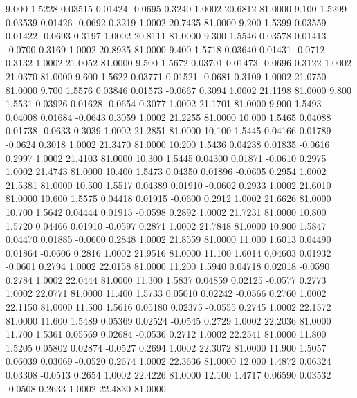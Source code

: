    9.000   1.5228   0.03515   0.01424  -0.0695   0.3240   1.0002  20.6812  81.0000
   9.100   1.5299   0.03539   0.01426  -0.0692   0.3219   1.0002  20.7435  81.0000
   9.200   1.5399   0.03559   0.01422  -0.0693   0.3197   1.0002  20.8111  81.0000
   9.300   1.5546   0.03578   0.01413  -0.0700   0.3169   1.0002  20.8935  81.0000
   9.400   1.5718   0.03640   0.01431  -0.0712   0.3132   1.0002  21.0052  81.0000
   9.500   1.5672   0.03701   0.01473  -0.0696   0.3122   1.0002  21.0370  81.0000
   9.600   1.5622   0.03771   0.01521  -0.0681   0.3109   1.0002  21.0750  81.0000
   9.700   1.5576   0.03846   0.01573  -0.0667   0.3094   1.0002  21.1198  81.0000
   9.800   1.5531   0.03926   0.01628  -0.0654   0.3077   1.0002  21.1701  81.0000
   9.900   1.5493   0.04008   0.01684  -0.0643   0.3059   1.0002  21.2255  81.0000
  10.000   1.5465   0.04088   0.01738  -0.0633   0.3039   1.0002  21.2851  81.0000
  10.100   1.5445   0.04166   0.01789  -0.0624   0.3018   1.0002  21.3470  81.0000
  10.200   1.5436   0.04238   0.01835  -0.0616   0.2997   1.0002  21.4103  81.0000
  10.300   1.5445   0.04300   0.01871  -0.0610   0.2975   1.0002  21.4743  81.0000
  10.400   1.5473   0.04350   0.01896  -0.0605   0.2954   1.0002  21.5381  81.0000
  10.500   1.5517   0.04389   0.01910  -0.0602   0.2933   1.0002  21.6010  81.0000
  10.600   1.5575   0.04418   0.01915  -0.0600   0.2912   1.0002  21.6626  81.0000
  10.700   1.5642   0.04444   0.01915  -0.0598   0.2892   1.0002  21.7231  81.0000
  10.800   1.5720   0.04466   0.01910  -0.0597   0.2871   1.0002  21.7848  81.0000
  10.900   1.5847   0.04470   0.01885  -0.0600   0.2848   1.0002  21.8559  81.0000
  11.000   1.6013   0.04490   0.01864  -0.0606   0.2816   1.0002  21.9516  81.0000
  11.100   1.6014   0.04603   0.01932  -0.0601   0.2794   1.0002  22.0158  81.0000
  11.200   1.5940   0.04718   0.02018  -0.0590   0.2784   1.0002  22.0444  81.0000
  11.300   1.5837   0.04859   0.02125  -0.0577   0.2773   1.0002  22.0771  81.0000
  11.400   1.5733   0.05010   0.02242  -0.0566   0.2760   1.0002  22.1150  81.0000
  11.500   1.5616   0.05180   0.02375  -0.0555   0.2745   1.0002  22.1572  81.0000
  11.600   1.5489   0.05369   0.02524  -0.0545   0.2729   1.0002  22.2036  81.0000
  11.700   1.5361   0.05569   0.02684  -0.0536   0.2712   1.0002  22.2541  81.0000
  11.800   1.5205   0.05802   0.02874  -0.0527   0.2694   1.0002  22.3072  81.0000
  11.900   1.5057   0.06039   0.03069  -0.0520   0.2674   1.0002  22.3636  81.0000
  12.000   1.4872   0.06324   0.03308  -0.0513   0.2654   1.0002  22.4226  81.0000
  12.100   1.4717   0.06590   0.03532  -0.0508   0.2633   1.0002  22.4830  81.0000
